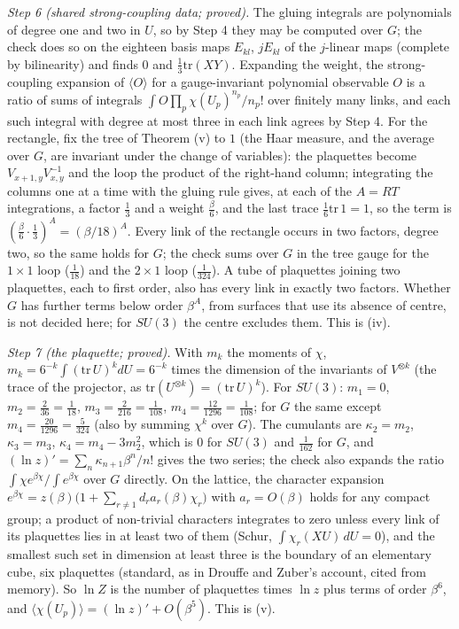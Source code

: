 \emph{Step 6 (shared strong-coupling data; proved).} The gluing integrals are polynomials of degree one and two in $U$, so by Step 4 they may be computed over $G$; the check does so on the eighteen basis maps $E_{kl}$, $jE_{kl}$ of the $j$-linear maps (complete by bilinearity) and finds $0$ and $\tfrac13\mathrm{tr}(XY)$. Expanding the weight, the strong-coupling expansion of $\langle O\rangle$ for a gauge-invariant polynomial observable $O$ is a ratio of sums of integrals $\int O\prod_{p}\chi(U_{p})^{n_{p}}/n_{p}!$ over finitely many links, and each such integral with degree at most three in each link agrees by Step 4. For the rectangle, fix the tree of Theorem (v) to $1$ (the Haar measure, and the average over $G$, are invariant under the change of variables): the plaquettes become $V_{x+1,y}V_{x,y}^{-1}$ and the loop the product of the right-hand column; integrating the columns one at a time with the gluing rule gives, at each of the $A = RT$ integrations, a factor $\tfrac13$ and a weight $\tfrac{\beta}{6}$, and the last trace $\tfrac16\mathrm{tr}\,1 = 1$, so the term is $(\tfrac{\beta}{6}\cdot\tfrac13)^{A} = (\beta/18)^{A}$. Every link of the rectangle occurs in two factors, degree two, so the same holds for $G$; the check sums over $G$ in the tree gauge for the $1 \times 1$ loop ($\tfrac{1}{18}$) and the $2 \times 1$ loop ($\tfrac{1}{324}$). A tube of plaquettes joining two plaquettes, each to first order, also has every link in exactly two factors. Whether $G$ has further terms below order $\beta^{A}$, from surfaces that use its absence of centre, is not decided here; for $SU(3)$ the centre excludes them. This is (iv).

\emph{Step 7 (the plaquette; proved).} With $m_{k}$ the moments of $\chi$, $m_{k} = 6^{-k}\int(\mathrm{tr}\,U)^{k}dU = 6^{-k}$ times the dimension of the invariants of $V^{\otimes k}$ (the trace of the projector, as $\mathrm{tr}(U^{\otimes k}) = (\mathrm{tr}\,U)^{k}$). For $SU(3)$: $m_{1} = 0$, $m_{2} = \tfrac{2}{36} = \tfrac1{18}$, $m_{3} = \tfrac{2}{216} = \tfrac1{108}$, $m_{4} = \tfrac{12}{1296} = \tfrac1{108}$; for $G$ the same except $m_{4} = \tfrac{20}{1296} = \tfrac{5}{324}$ (also by summing $\chi^{k}$ over $G$). The cumulants are $\kappa_{2} = m_{2}$, $\kappa_{3} = m_{3}$, $\kappa_{4} = m_{4} - 3m_{2}^{2}$, which is $0$ for $SU(3)$ and $\tfrac{1}{162}$ for $G$, and $(\ln z)' = \sum_{n}\kappa_{n+1}\beta^{n}/n!$ gives the two series; the check also expands the ratio $\int\chi e^{\beta\chi}/\int e^{\beta\chi}$ over $G$ directly. On the lattice, the character expansion $e^{\beta\chi} = z(\beta)\bigl(1 + \sum_{r \neq 1}d_{r}a_{r}(\beta)\chi_{r}\bigr)$ with $a_{r} = O(\beta)$ holds for any compact group; a product of non-trivial characters integrates to zero unless every link of its plaquettes lies in at least two of them (Schur, $\int\chi_{r}(XU)\,dU = 0$), and the smallest such set in dimension at least three is the boundary of an elementary cube, six plaquettes (standard, as in Drouffe and Zuber's account, cited from memory). So $\ln Z$ is the number of plaquettes times $\ln z$ plus terms of order $\beta^{6}$, and $\langle\chi(U_{p})\rangle = (\ln z)' + O(\beta^{5})$. This is (v).

